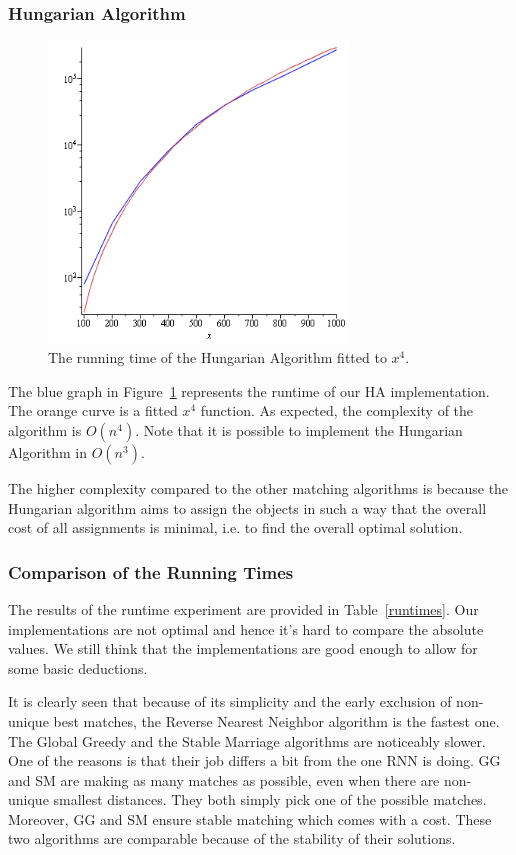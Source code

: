 \documentclass[a4paper,11pt]{article}
\begin{document}
\subsubsection{Hungarian Algorithm}

\begin{figure}[ht!]
\centering 
\includegraphics[width=80mm]{HA_runtime.png}
\caption{The running time of the Hungarian Algorithm fitted to $x^4$.}
\label{hung} 
\end{figure}

The blue graph in Figure~\ref{hung} represents the runtime of our HA implementation. The orange curve is a fitted $x^4$ function. As expected, the complexity of the algorithm is $O(n^{4})$. Note that it is possible to implement the Hungarian Algorithm in $O(n^{3})$.

The higher complexity compared to the other matching algorithms is because the Hungarian algorithm aims to assign the objects in such a way that the overall cost of all assignments is minimal, i.e. to find the overall optimal solution.

\subsubsection{Comparison of the Running Times}
The results of the runtime experiment are provided in Table~\ref{runtimes}. Our implementations are not optimal and hence it's hard to compare the absolute values. We still think that the implementations are good enough to allow for some basic deductions.


It is clearly seen that because of its simplicity and the early exclusion of non-unique best matches, the Reverse Nearest Neighbor algorithm is the fastest one. The Global Greedy and the Stable Marriage algorithms are noticeably slower. One of the reasons is that their job differs a bit from the one RNN is doing. GG and SM are making as many matches as possible, even when there are non-unique smallest distances. They both simply pick one of the possible matches. Moreover, GG and SM ensure stable matching which comes with a cost. These two algorithms are comparable because of the stability of their solutions.
\end{document}
